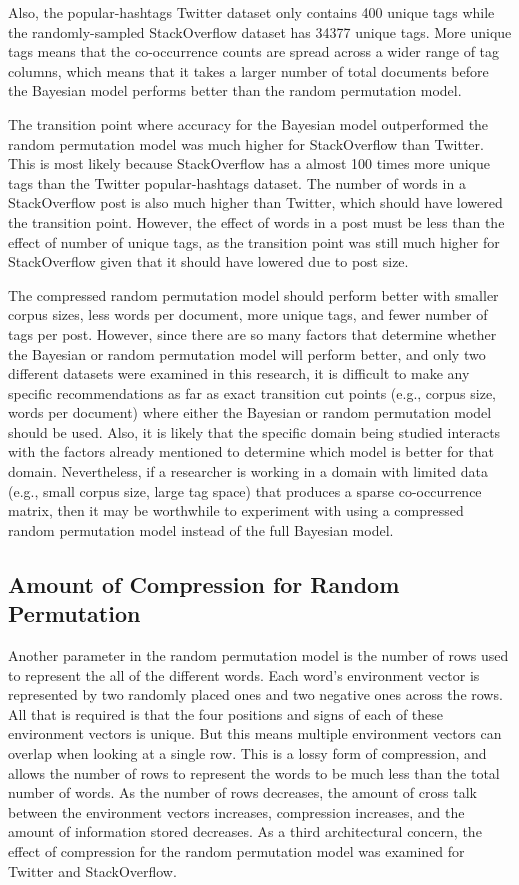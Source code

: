 \documentclass[man,floatsintext,donotrepeattitle]{apa6}
\begin{document}
Also, the popular-hashtags Twitter dataset only contains 400 unique tags while the randomly-sampled StackOverflow dataset has \num{34377} unique tags.
More unique tags means that the co-occurrence counts are spread across a wider range of tag columns,
which means that it takes a larger number of total documents before the Bayesian model performs better than the random permutation model.

The transition point where accuracy for the Bayesian model outperformed the random permutation model was much higher for StackOverflow than Twitter.
This is most likely because StackOverflow has a almost \num{100} times more unique tags than the Twitter popular-hashtags dataset.
The number of words in a StackOverflow post is also much higher than Twitter, which should have lowered the transition point.
However, the effect of words in a post must be less than the effect of number of unique tags, as the transition point was still much higher for StackOverflow given that it should have lowered due to post size.

The compressed random permutation model should perform better with smaller corpus sizes, less words per document, more unique tags, and fewer number of tags per post.
However, since there are so many factors that determine whether the Bayesian or random permutation model will perform better,
and only two different datasets were examined in this research,
it is difficult to make any specific recommendations as far as exact transition cut points (e.g., corpus size, words per document) where either the Bayesian or random permutation model should be used.
Also, it is likely that the specific domain being studied interacts with the factors already mentioned to determine which model is better for that domain.
Nevertheless, if a researcher is working in a domain with limited data (e.g., small corpus size, large tag space) that produces a sparse co-occurrence matrix,
then it may be worthwhile to experiment with using a compressed random permutation model instead of the full Bayesian model.

\subsection{Amount of Compression for Random Permutation}

Another parameter in the random permutation model is the number of rows used to represent the all of the different words.
Each word's environment vector is represented by two randomly placed ones and two negative ones across the rows.
All that is required is that the four positions and signs of each of these environment vectors is unique.
But this means multiple environment vectors can overlap when looking at a single row.
This is a lossy form of compression, and allows the number of rows to represent the words to be much less than the total number of words.
As the number of rows decreases, the amount of cross talk between the environment vectors increases, compression increases, and the amount of information stored decreases.
As a third architectural concern, the effect of compression for the random permutation model was examined for Twitter and StackOverflow.
\end{document}

